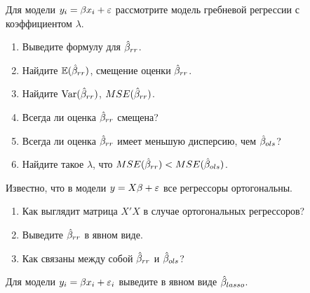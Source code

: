\begin{problem}
Для модели $y_i=\beta x_i+\varepsilon$ рассмотрите модель гребневой регрессии с коэффициентом $\lambda$.
\begin{enumerate}
\item Выведите формулу для $\hat{\beta}_{rr}$.
\item Найдите $\mathbb{E}(\hat{\beta}_{rr})$, смещение оценки $\hat{\beta}_{rr}$.
\item Найдите $\operatorname{Var}(\hat{\beta}_{rr})$, $MSE(\hat{\beta}_{rr})$.
\item Всегда ли оценка $\hat{\beta}_{rr}$ смещена?
\item Всегда ли оценка $\hat{\beta}_{rr}$ имеет меньшую дисперсию, чем $\hat{\beta}_{ols}$?
\item Найдите такое $\lambda$, что $MSE(\hat{\beta}_{rr})<MSE(\hat{\beta}_{ols})$.
\end{enumerate}

\begin{sol}
\end{sol}
\end{problem}




\begin{problem}
Известно, что в модели $y=X\beta+\varepsilon$ все регрессоры ортогональны.
\begin{enumerate}
\item Как выглядит матрица $X'X$ в случае ортогональных регрессоров?
\item Выведите $\hat{\beta}_{rr}$ в явном виде.
\item Как связаны между собой $\hat{\beta}_{rr}$ и $\hat{\beta}_{ols}$?
\end{enumerate}

\begin{sol}
\end{sol}
\end{problem}



\begin{problem}
Для модели $y_i=\beta x_i + \varepsilon_i$ выведите в явном виде $\hat{\beta}_{lasso}$.

\begin{sol}
\end{sol}
\end{problem}



